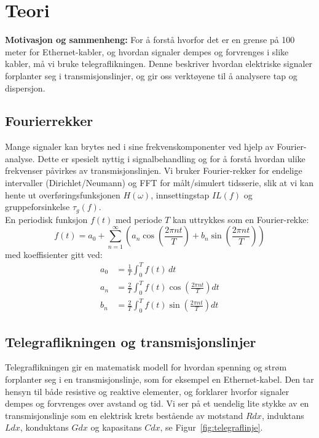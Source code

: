 
\section{Teori}

    \textbf{Motivasjon og sammenheng:} For å forstå hvorfor det er en grense på 100 meter for Ethernet-kabler, og hvordan signaler dempes og forvrenges i slike kabler, må vi bruke telegraflikningen. Denne beskriver hvordan elektriske signaler forplanter seg i transmisjonslinjer, og gir oss verktøyene til å analysere tap og dispersjon.

\subsection{Fourierrekker}

Mange signaler kan brytes ned i sine frekvenskomponenter ved hjelp av Fourier-analyse. Dette er spesielt nyttig i signalbehandling og for å forstå hvordan ulike frekvenser påvirkes av transmisjonslinjen. Vi bruker Fourier-rekker for endelige intervaller (Dirichlet/Neumann) og FFT for målt/simulert tidsserie, slik at vi kan hente ut overføringsfunksjonen $H(\omega)$, innsettingstap $IL(f)$ og gruppeforsinkelse $\tau_g(f)$.\\[1em]
En periodisk funksjon $f(t)$ med periode $T$ kan uttrykkes som en Fourier-rekke:
\begin{equation}
f(t) = a_0 + \sum_{n=1}^{\infty} \left( a_n \cos\left(\frac{2\pi n t}{T}\right) + b_n \sin\left(\frac{2\pi n t}{T}\right) \right)
\end{equation}
med koeffisienter gitt ved:
\begin{align*}
a_0 &= \frac{1}{T} \int_{0}^{T} f(t) \, dt \\
a_n &= \frac{2}{T} \int_{0}^{T} f(t) \cos\left(\frac{2\pi n t}{T}\right) dt \\
b_n &= \frac{2}{T} \int_{0}^{T} f(t) \sin\left(\frac{2\pi n t}{T}\right) dt
\end{align*}

\clearpage
\subsection{Telegraflikningen og transmisjonslinjer}

Telegraflikningen gir en matematisk modell for hvordan spenning og strøm forplanter seg i en transmisjonslinje, som for eksempel en Ethernet-kabel. Den tar hensyn til både resistive og reaktive elementer, og forklarer hvorfor signaler dempes og forvrenges over avstand og tid.
Vi ser på et uendelig lite stykke av en transmisjonslinje som en elektrisk krets bestående av motstand $R dx$, induktans $L dx$, konduktans $G dx$ og kapasitans $C dx$, se Figur~\ref{fig:telegraflinje}.

